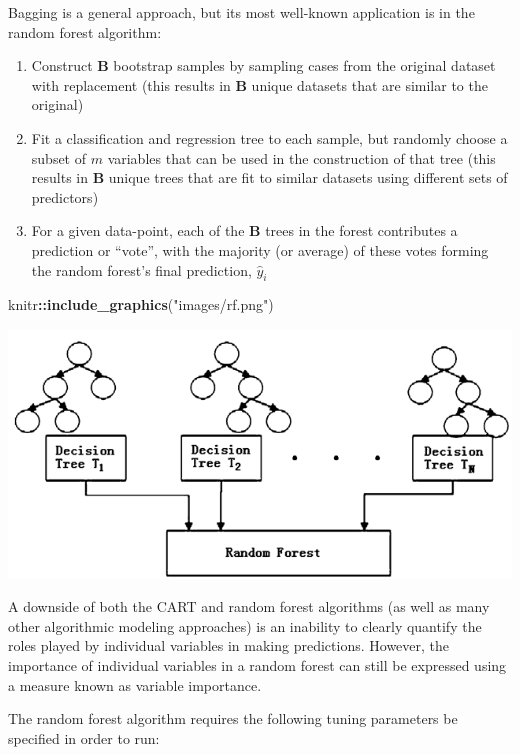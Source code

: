 \documentclass[
]{book}
\newenvironment{Shaded}{\begin{snugshade}}{\end{snugshade}}
\newcommand{\FunctionTok}[1]{\textcolor[rgb]{0.13,0.29,0.53}{\textbf{#1}}}
\newcommand{\NormalTok}[1]{#1}
\newcommand{\SpecialCharTok}[1]{\textcolor[rgb]{0.81,0.36,0.00}{\textbf{#1}}}
\newcommand{\StringTok}[1]{\textcolor[rgb]{0.31,0.60,0.02}{#1}}
\providecommand{\tightlist}{%
  \setlength{\itemsep}{0pt}\setlength{\parskip}{0pt}}
\theoremstyle{definition}
\theoremstyle{definition}
\theoremstyle{definition}
\theoremstyle{definition}
\theoremstyle{remark}
\begin{document}
Bagging is a general approach, but its most well-known application is in the random forest algorithm:

\begin{enumerate}
\def\labelenumi{\arabic{enumi}.}
\tightlist
\item
  Construct \(\boldsymbol{B}\) bootstrap samples by sampling cases from the original dataset with replacement (this results in \(\boldsymbol{B}\) unique datasets that are similar to the original)
\item
  Fit a classification and regression tree to each sample, but randomly choose a subset of \(m\) variables that can be used in the construction of that tree (this results in \(\boldsymbol{B}\) unique trees that are fit to similar datasets using different sets of predictors)
\item
  For a given data-point, each of the \(\boldsymbol{B}\) trees in the forest contributes a prediction or ``vote'', with the majority (or average) of these votes forming the random forest's final prediction, \(\hat{y}_i\)
\end{enumerate}

\begin{Shaded}
\begin{Highlighting}[]
\NormalTok{knitr}\SpecialCharTok{::}\FunctionTok{include\_graphics}\NormalTok{(}\StringTok{"images/rf.png"}\NormalTok{)}
\end{Highlighting}
\end{Shaded}

\includegraphics[width=0.8\linewidth]{images/rf}

A downside of both the CART and random forest algorithms (as well as many other algorithmic modeling approaches) is an inability to clearly quantify the roles played by individual variables in making predictions. However, the importance of individual variables in a random forest can still be expressed using a measure known as variable importance.

The random forest algorithm requires the following tuning parameters be specified in order to run:
\end{document}
